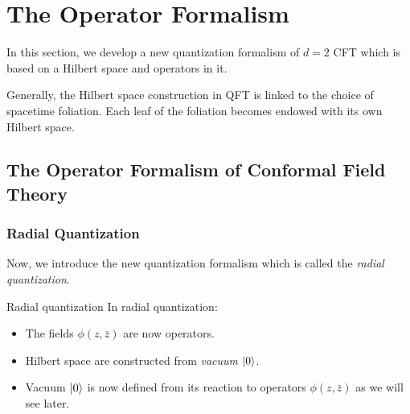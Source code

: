 \documentclass[10pt]{article}
\newenvironment{boxmath}[1]{\begin{tcolorbox}[enhanced,attach boxed title to top center={yshift=-\tcboxedtitleheight/2},boxrule=1pt,title={\centering #1},colframe=NavyBlue!70!black,colback=NavyBlue!10,colbacktitle=NavyBlue!10,fonttitle=\scshape,coltitle=Black]}{\end{tcolorbox}}
\begin{document}
\section{The Operator Formalism}
In this section, we develop a new quantization formalism of $d=2$ CFT which is based on a Hilbert space and operators in it.
\begin{intu}
    Generally, the Hilbert space construction in QFT is linked to the choice of spacetime foliation.
    Each leaf of the foliation becomes endowed with its own Hilbert space.
\end{intu}

\subsection{The Operator Formalism of Conformal Field Theory}
\subsubsection{Radial Quantization}
Now, we introduce the new quantization formalism which is called the \textit{radial quantization}.
\begin{property}{Radial quantization}
    In radial quantization:
    \begin{itemize}
        \item The fields $\phi(z,\bar{z})$ are now operators.
        \item Hilbert space are constructed from \textit{vacuum} $\ket{0}$.
        \item Vacuum $\ket{0}$ is now defined from its reaction to operators $\phi(z,\bar{z})$ as we will see later.
    \end{itemize}
\end{property}
\end{document}
